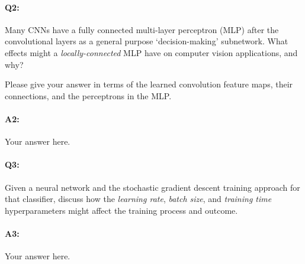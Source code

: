 




\pagebreak
\paragraph{Q2:} Many CNNs have a fully connected multi-layer perceptron (MLP) after the convolutional layers as a general purpose `decision-making' subnetwork. What effects might a \emph{locally-connected} MLP have on computer vision applications, and why? 

Please give your answer in terms of the learned convolution feature maps, their connections, and the perceptrons in the MLP.

\paragraph{A2:} Your answer here.




\pagebreak
\paragraph{Q3:} Given a neural network and the stochastic gradient descent training approach for that classifier, discuss how the \emph{learning rate}, \emph{batch size}, and \emph{training time} hyperparameters might affect the training process and outcome.

\paragraph{A3:} Your answer here.





